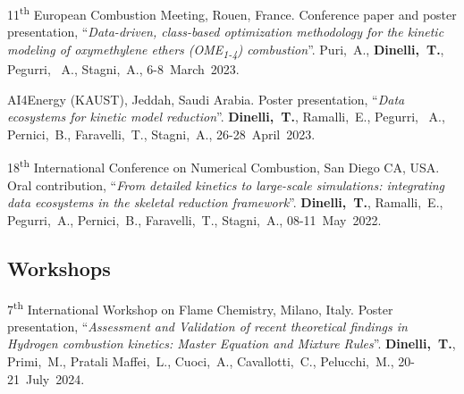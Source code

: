 \begin{etaremune}
    \item
    11\textsuperscript{th} European Combustion Meeting, Rouen, France. Conference paper
    and poster presentation, ``{\it Data-driven, class-based optimization methodology
    for the kinetic modeling of oxymethylene ethers (OME\textsubscript{1-4}) combustion}''.
    Puri,~A., {\bf Dinelli,~T.}, Pegurri, ~A., Stagni,~A.,
    6-8~March~2023.

    \item
    AI4Energy (KAUST), Jeddah, Saudi Arabia. Poster presentation, ``{\it Data ecosystems for
    kinetic model reduction}''. {\bf Dinelli,~T.}, Ramalli,~E., Pegurri,
    ~A., Pernici,~B., Faravelli,~T., Stagni,~A.,
    26-28~April~2023.

    \item
    18\textsuperscript{th} International Conference on Numerical Combustion, San Diego
    CA, USA. Oral contribution, ``{\it From detailed kinetics to large-scale
    simulations: integrating data ecosystems in the skeletal reduction framework}''.
    {\bf Dinelli,~T.}, Ramalli,~E., Pegurri,~A., Pernici,~B.,
    Faravelli,~T., Stagni,~A.,
    08-11~May~2022.
\end{etaremune}

\subsection{Workshops}
\begin{etaremune}
    \item
    7\textsuperscript{th} International Workshop on Flame Chemistry, Milano, Italy.
    Poster presentation, ``{\it Assessment and Validation of recent theoretical
    findings in Hydrogen combustion kinetics: Master Equation and Mixture Rules}''.
    {\bf Dinelli,~T.}, Primi,~M., Pratali Maffei,~L., Cuoci,~A.,
    Cavallotti,~C., Pelucchi,~M.,
    20-21~July~2024.
\end{etaremune}
